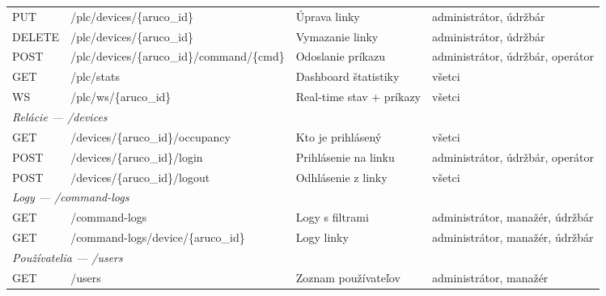 \begin{table}[H]
{\begin{tabular}{|l|l|l|l|}
                  PUT             & /plc/devices/\{aruco\_id\}                 & Úprava linky                 & administrátor, údržbár           \\
                  DELETE          & /plc/devices/\{aruco\_id\}                 & Vymazanie linky              & administrátor, údržbár           \\
                  POST            & /plc/devices/\{aruco\_id\}/command/\{cmd\} & Odoslanie príkazu                 & administrátor, údržbár, operátor \\
                  GET             & /plc/stats                                 & Dashboard štatistiky              & všetci                   \\
                  WS              & /plc/ws/\{aruco\_id\}                      & Real-time stav + príkazy          & všetci                   \\
                  \hline
                  \multicolumn{4}{|l|}{\textit{Relácie — /devices}}                                                                           \\
                  \hline
                  GET             & /devices/\{aruco\_id\}/occupancy           & Kto je prihlásený                 & všetci                   \\
                  POST            & /devices/\{aruco\_id\}/login               & Prihlásenie na linku         & administrátor, údržbár, operátor \\
                  POST            & /devices/\{aruco\_id\}/logout              & Odhlásenie z linky          & všetci                   \\
                  \hline
                  \multicolumn{4}{|l|}{\textit{Logy — /command-logs}}                                                                         \\
                  \hline
                  GET             & /command-logs                              & Logy s filtrami                   & administrátor, manažér, údržbár  \\
                  GET             & /command-logs/device/\{aruco\_id\}         & Logy linky                   & administrátor, manažér, údržbár  \\
                  \hline
                  \multicolumn{4}{|l|}{\textit{Používatelia — /users}}                                                                        \\
                  \hline
                  GET             & /users                                     & Zoznam používateľov               & administrátor, manažér           \\

\end{tabular}}
\end{table}
